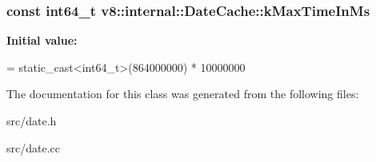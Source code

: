 \subsubsection[{k\+Max\+Time\+In\+Ms}]{\setlength{\rightskip}{0pt plus 5cm}const int64\+\_\+t v8\+::internal\+::\+Date\+Cache\+::k\+Max\+Time\+In\+Ms\hspace{0.3cm}{\ttfamily [static]}}\label{classv8_1_1internal_1_1_date_cache_a9b5d4e427df84cc594d6a541f9ea309e}
{\bfseries Initial value\+:}
\begin{DoxyCode}
=
      \textcolor{keyword}{static\_cast<}int64\_t\textcolor{keyword}{>}(864000000) * 10000000
\end{DoxyCode}


The documentation for this class was generated from the following files\+:\begin{DoxyCompactItemize}
\item 
src/date.\+h\item 
src/date.\+cc\end{DoxyCompactItemize}
